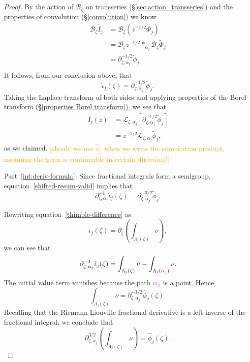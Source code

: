\documentclass{article}
\theoremstyle{definition}
\newcommand{\C}{\mathbb{C}}
\newcommand{\fracderiv}[3]{\partial^{#1}_{#2, #3}}
\newcommand{\laplace}{\mathcal{L}}
\newcommand{\borel}{\mathcal{B}}
\begin{document}
\begin{proof}
By the action of $\borel_\zeta$ on transseries (\S \ref{sec:action_transseries}) and the properties of convolution (\S \ref{convolution}) we know 
\begin{align*}
\borel_{\zeta} \tilde{I}_j & = \borel_{\zeta}( z^{-1/2} \tilde{\Phi}_j) \\
&=\borel_\zeta z^{-1/2}\ast_{\alpha_j}\borel_\zeta\tilde{\Phi}_j\\
& = \fracderiv{-1/2}{\zeta}{\alpha_j}  \tilde{\phi}_j \\
\end{align*}
It follows, from our conclusion above, that
\begin{equation}\label{shifted-resum-valid}
\hat{\iota}_j(\zeta) = \fracderiv{-1/2}{\zeta}{\alpha_j} \tilde{\phi}_j.
\end{equation}
Taking the Laplace transform of both sides and applying properties of the Borel transform (\S \ref{properties Borel transform}), we see that
\begin{align*}
I_j(z) & = \laplace_{\zeta, \alpha_j} \left[ \partial^{-1/2}_{\zeta, \alpha_j}  \tilde{\phi}_j \right] \\
& = z^{-1/2} \laplace_{\zeta, \alpha_j} \tilde{\phi}_j,
\end{align*}
as we claimed. \textcolor{orange}{[should we use $\hat{\phi}_j$ when we write the convolution product, assuming the germ is continuable in certain direction?]}

Part~\eqref{int:deriv-formula}: Since fractional integrals form a semigroup, equation~\eqref{shifted-resum-valid} implies that
\[ \fracderiv{-1}{\zeta}{\alpha_j} \hat{\iota}_j(\zeta) = \fracderiv{-3/2}{\zeta}{\alpha_j} \tilde{\phi}_j. \]

Rewriting equation~\eqref{thimble-difference} as
\[ \hat{\iota}_j(\zeta) = \partial_\zeta \left( \int_{\Lambda_j(\zeta)} \nu \right), \]
we can see that
\[ \fracderiv{-1}{\zeta}{\alpha_j} \hat{\iota}_j(\zeta) = \int_{\Lambda_j(\zeta)} \nu - \int_{\Lambda_j(\textcolor{Magenta}{\alpha_j})} \nu. \]
The initial value term vanishes because the path $\textcolor{Magenta}{\alpha_j}$ is a point. Hence,
\[ \int_{\Lambda_j(\zeta)} \nu = \fracderiv{-3/2}{\zeta}{\alpha_j} \hat{\phi}_j(\zeta). \]
Recalling that the Riemann-Liouville fractional derivative is a left inverse of the fractional integral, we conclude that
\[ \fracderiv{3/2}{\zeta}{\alpha_j} \left( \int_{\Lambda_j(\zeta)} \nu \right) = \hat{\phi}_j(\zeta). \]
\end{proof}
\end{document}

